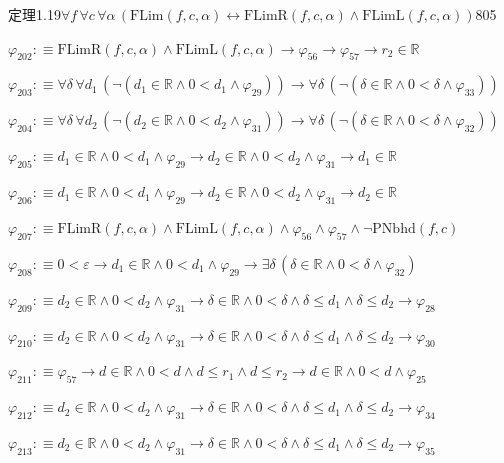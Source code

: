 \begin{fullproof}{定理1.19}{$\forall f\,\forall c\,\forall \alpha\,(\mathrm{FLim}(f,c,\alpha) \leftrightarrow \mathrm{FLimR}(f,c,\alpha) \land \mathrm{FLimL}(f,c,\alpha))$}{805}
\begin{abbrevlist}
\item $\varphi_{202} :\equiv \mathrm{FLimR}(f,c,\alpha) \land \mathrm{FLimL}(f,c,\alpha) \to \varphi_{56} \to \varphi_{57} \to r_{2} \in \mathbb{R}$
\item $\varphi_{203} :\equiv \forall \delta\,\forall d_{1}\,(\neg (d_{1} \in \mathbb{R} \land 0 < d_{1} \land \varphi_{29})) \to \forall \delta\,(\neg (\delta \in \mathbb{R} \land 0 < \delta \land \varphi_{33}))$
\item $\varphi_{204} :\equiv \forall \delta\,\forall d_{2}\,(\neg (d_{2} \in \mathbb{R} \land 0 < d_{2} \land \varphi_{31})) \to \forall \delta\,(\neg (\delta \in \mathbb{R} \land 0 < \delta \land \varphi_{32}))$
\item $\varphi_{205} :\equiv d_{1} \in \mathbb{R} \land 0 < d_{1} \land \varphi_{29} \to d_{2} \in \mathbb{R} \land 0 < d_{2} \land \varphi_{31} \to d_{1} \in \mathbb{R}$
\item $\varphi_{206} :\equiv d_{1} \in \mathbb{R} \land 0 < d_{1} \land \varphi_{29} \to d_{2} \in \mathbb{R} \land 0 < d_{2} \land \varphi_{31} \to d_{2} \in \mathbb{R}$
\item $\varphi_{207} :\equiv \mathrm{FLimR}(f,c,\alpha) \land \mathrm{FLimL}(f,c,\alpha) \land \varphi_{56} \land \varphi_{57} \land \neg \mathrm{PNbhd}(f,c)$
\item $\varphi_{208} :\equiv 0 < \varepsilon \to d_{1} \in \mathbb{R} \land 0 < d_{1} \land \varphi_{29} \to \exists \delta\,(\delta \in \mathbb{R} \land 0 < \delta \land \varphi_{32})$
\item $\varphi_{209} :\equiv d_{2} \in \mathbb{R} \land 0 < d_{2} \land \varphi_{31} \to \delta \in \mathbb{R} \land 0 < \delta \land \delta \leq d_{1} \land \delta \leq d_{2} \to \varphi_{28}$
\item $\varphi_{210} :\equiv d_{2} \in \mathbb{R} \land 0 < d_{2} \land \varphi_{31} \to \delta \in \mathbb{R} \land 0 < \delta \land \delta \leq d_{1} \land \delta \leq d_{2} \to \varphi_{30}$
\item $\varphi_{211} :\equiv \varphi_{57} \to d \in \mathbb{R} \land 0 < d \land d \leq r_{1} \land d \leq r_{2} \to d \in \mathbb{R} \land 0 < d \land \varphi_{25}$
\item $\varphi_{212} :\equiv d_{2} \in \mathbb{R} \land 0 < d_{2} \land \varphi_{31} \to \delta \in \mathbb{R} \land 0 < \delta \land \delta \leq d_{1} \land \delta \leq d_{2} \to \varphi_{34}$
\item $\varphi_{213} :\equiv d_{2} \in \mathbb{R} \land 0 < d_{2} \land \varphi_{31} \to \delta \in \mathbb{R} \land 0 < \delta \land \delta \leq d_{1} \land \delta \leq d_{2} \to \varphi_{35}$

\end{abbrevlist}
\end{fullproof}
